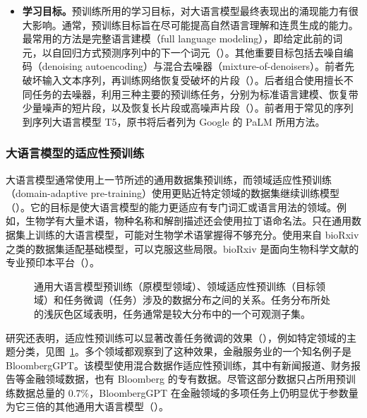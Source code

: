\begin{itemize}
\item \textbf{学习目标。}预训练所用的学习目标，对大语言模型最终表现出的涌现能力有很大影响。通常，预训练目标旨在尽可能提高自然语言理解和连贯生成的能力。最常用的方法是完整语言建模（full language modeling），即给定此前的词元，以自回归方式预测序列中的下一个词元（）。其他重要目标包括去噪自编码（denoising autoencoding）与混合去噪器（mixture-of-denoisers）。前者先破坏输入文本序列，再训练网络恢复受破坏的片段（）。后者组合使用擅长不同任务的去噪器，利用三种主要的预训练任务，分别为标准语言建模、恢复带少量噪声的短片段，以及恢复长片段或高噪声片段（）。前者用于常见的序列到序列大语言模型 T5，原书将后者列为 Google 的 PaLM 所用方法。
\end{itemize}

\subsubsection{大语言模型的适应性预训练}
大语言模型通常使用上一节所述的通用数据集预训练，而领域适应性预训练（domain-adaptive pre-training）使用更贴近特定领域的数据集继续训练模型（）。它的目标是使大语言模型的能力更适应有专门词汇或语言用法的领域。例如，生物学有大量术语，物种名称和解剖描述还会使用拉丁语命名法。只在通用数据集上训练的大语言模型，可能对生物学术语掌握得不够充分。使用来自 bioRxiv 之类的数据集适配基础模型，可以克服这些局限。bioRxiv 是面向生物科学文献的专业预印本平台（）。

\begin{figure}[!htbp]
\centering

\caption{通用大语言模型预训练（原模型领域）、领域适应性预训练（目标领域）和任务微调（任务）涉及的数据分布之间的关系。任务分布所处的浅灰色区域表明，任务通常是较大分布中的一个可观测子集。}
\label{fig:ch01-domain}
\end{figure}

研究还表明，适应性预训练可以显著改善任务微调的效果（），例如特定领域的主题分类，见图~\ref{fig:ch01-domain}。多个领域都观察到了这种效果，金融服务业的一个知名例子是 BloombergGPT。该模型使用混合数据作适应性预训练，其中有新闻报道、财务报告等金融领域数据，也有 Bloomberg 的专有数据。尽管这部分数据只占所用预训练数据总量的 0.7\%，BloombergGPT 在金融领域的多项任务上仍明显优于参数量为它三倍的其他通用大语言模型（）。

